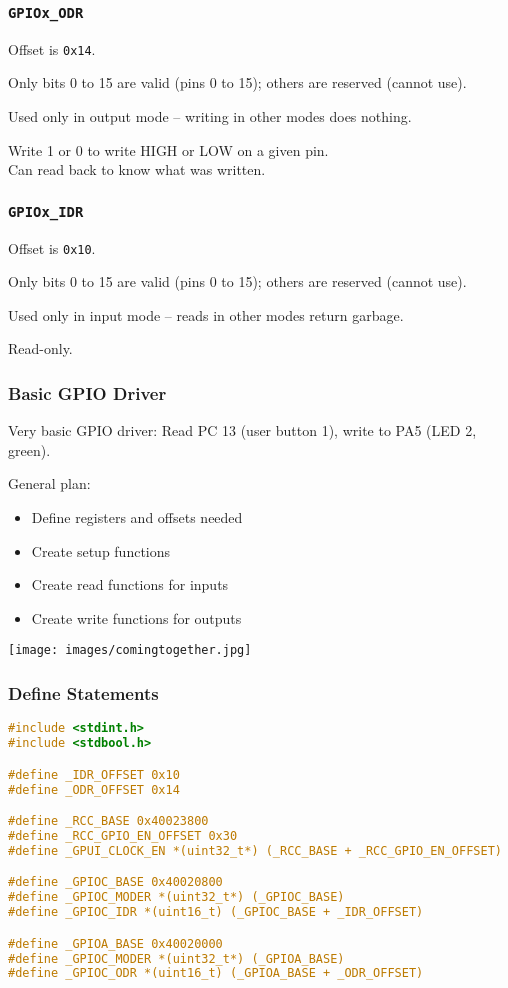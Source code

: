 \begin{frame}
\frametitle{\texttt{GPIOx\_ODR}}

Offset is \texttt{0x14}.

Only bits 0 to 15 are valid (pins 0 to 15); others are reserved (cannot use).

Used only in output mode -- writing in other modes does nothing.

Write 1 or 0 to write HIGH or LOW on a given pin.\\
\quad Can read back to know what was written.

\end{frame}


\begin{frame}
\frametitle{\texttt{GPIOx\_IDR}}

Offset is \texttt{0x10}.

Only bits 0 to 15 are valid (pins 0 to 15); others are reserved (cannot use).

Used only in input mode -- reads in other modes return garbage.

Read-only.

\end{frame}


\begin{frame}
\frametitle{Basic GPIO Driver}

Very basic GPIO driver: Read PC 13 (user button 1), write to PA5 (LED 2, green).

General plan:

\begin{itemize}
	\item Define registers and offsets needed
	\item Create setup functions
	\item Create read functions for inputs
	\item Create write functions for outputs
\end{itemize}

\begin{center}
	\texttt{[image: images/comingtogether.jpg]}
\end{center}

\end{frame}


\begin{frame}[fragile]
\frametitle{Define Statements}

\begin{lstlisting}[language=C]
#include <stdint.h>
#include <stdbool.h>

#define _IDR_OFFSET 0x10
#define _ODR_OFFSET 0x14

#define _RCC_BASE 0x40023800
#define _RCC_GPIO_EN_OFFSET 0x30
#define _GPUI_CLOCK_EN *(uint32_t*) (_RCC_BASE + _RCC_GPIO_EN_OFFSET)

#define _GPIOC_BASE 0x40020800
#define _GPIOC_MODER *(uint32_t*) (_GPIOC_BASE)
#define _GPIOC_IDR *(uint16_t) (_GPIOC_BASE + _IDR_OFFSET)

#define _GPIOA_BASE 0x40020000
#define _GPIOC_MODER *(uint32_t*) (_GPIOA_BASE)
#define _GPIOC_ODR *(uint16_t) (_GPIOA_BASE + _ODR_OFFSET)
\end{lstlisting}


\end{frame}


